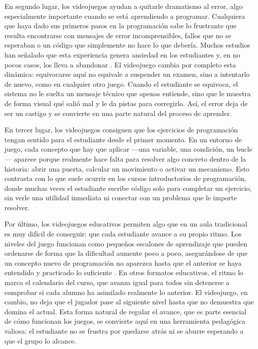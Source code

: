 En segundo lugar, los videojuegos ayudan a quitarle dramatismo al error, algo especialmente importante cuando se está aprendiendo a programar. Cualquiera que haya dado sus primeros pasos en la programación sabe lo frustrante que resulta encontrarse con mensajes de error incomprensibles, fallos que no se esperaban o un código que simplemente no hace lo que debería. Muchos estudios han señalado que esta experiencia genera ansiedad en los estudiantes y, en no pocos casos, los lleva a abandonar \cite{kiili_design_2012}. El videojuego cambia por completo esta dinámica: equivocarse aquí no equivale a suspender un examen, sino a intentarlo de nuevo, como en cualquier otro juego. Cuando el estudiante se equivoca, el sistema no le suelta un mensaje técnico que apenas entiende, sino que le muestra de forma visual qué salió mal y le da pistas para corregirlo. Así, el error deja de ser un castigo y se convierte en una parte natural del proceso de aprender.

En tercer lugar, los videojuegos consiguen que los ejercicios de programación tengan sentido para el estudiante desde el primer momento. En un entorno de juego, cada concepto que hay que aplicar —una variable, una condición, un bucle— aparece porque realmente hace falta para resolver algo concreto dentro de la historia: abrir una puerta, calcular un movimiento o activar un mecanismo. Esto contrasta con lo que suele ocurrir en los cursos introductorios de programación, donde muchas veces el estudiante escribe código solo para completar un ejercicio, sin verle una utilidad inmediata ni conectar con un problema que le importe resolver.

Por último, los videojuegos educativos permiten algo que en un aula tradicional es muy difícil de conseguir: que cada estudiante avance a su propio ritmo. Los niveles del juego funcionan como pequeños escalones de aprendizaje que pueden ordenarse de forma que la dificultad aumente poco a poco, asegurándose de que un concepto nuevo de programación no aparezca hasta que el anterior se haya entendido y practicado lo suficiente \cite{puritat_enhanced_2019}. En otros formatos educativos, el ritmo lo marca el calendario del curso, que avanza igual para todos sin detenerse a comprobar si cada alumno ha asimilado realmente lo anterior. El videojuego, en cambio, no deja que el jugador pase al siguiente nivel hasta que no demuestra que domina el actual. Esta forma natural de regular el avance, que es parte esencial de cómo funcionan los juegos, se convierte aquí en una herramienta pedagógica valiosa: el estudiante no se frustra por quedarse atrás ni se aburre esperando a que el grupo lo alcance.



